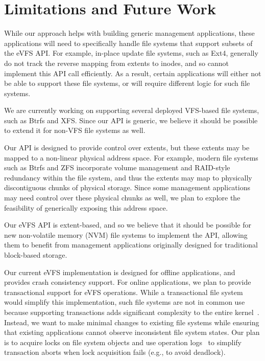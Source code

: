 \vspace{-0.25em}
\section{Limitations and Future Work\label{sec:Future_Work}}

While our approach helps with building generic management applications, these applications will need to specifically handle file systems that support subsets of the eVFS API. For example, in-place update file systems, such as Ext4, generally do not track the reverse mapping from extents to inodes, and so cannot implement this API call efficiently. As a result, certain applications will either not be able to support these file systems, or will require different logic for such file systems.

We are currently working on supporting several deployed VFS-based file systems, such as Btrfs and XFS. Since our API is generic, we believe it should be possible to extend it for non-VFS file systems as well.

Our API is designed to provide control over extents, but these extents may be mapped to a non-linear physical address space. For example, modern file systems such as Btrfs and ZFS incorporate volume management and RAID-style redundancy within the file system, and thus the extents may map to physically discontiguous chunks of physical storage. Since some management applications may need control over these physical chunks as well, we plan to explore the feasibility of generically exposing this address space.

Our eVFS API is extent-based, and so we believe that it should be possible for new non-volatile memory (NVM) file systems to implement the API, allowing them to benefit from management applications originally designed for traditional block-based storage.

Our current eVFS implementation is designed for offline applications, and provides crash consistency support. For online applications, we plan to provide transactional support for eVFS operations. While a transactional file system would simplify this implementation, such file systems are not in common use because supporting transactions adds significant complexity to the entire kernel~\cite{Spillane2009}. Instead, we want to make minimal changes to existing file systems while ensuring that existing applications cannot observe inconsistent file system states. Our plan is to acquire locks on file system objects and use operation logs~\cite{Pillai2017, Bhat2017} to simplify transaction aborts when lock acquisition fails (e.g., to avoid deadlock).

